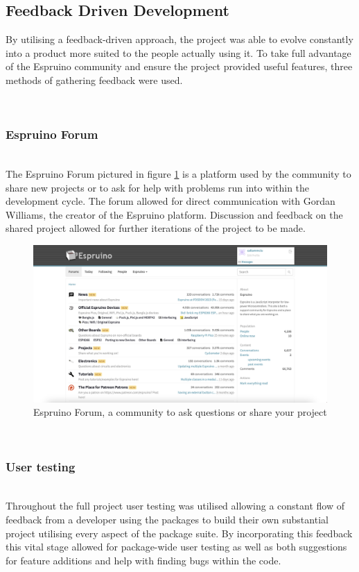 \documentclass{l4proj}
\begin{document}
\subsection{Feedback Driven Development}
By utilising a feedback-driven approach, the project was able to evolve constantly into a product more suited to the people actually using it. To take full advantage of the Espruino community and ensure the project provided useful features, three methods of gathering feedback were used.

\text \\

\subsubsection{Espruino Forum}\hfill\\
The Espruino Forum pictured in figure \ref{fig:espruino-forum} is a platform used by the community to share new projects or to ask for help with problems run into within the development cycle. The forum allowed for direct communication with Gordan Williams, the creator of the Espruino platform. Discussion and feedback on the shared project allowed for further iterations of the project to be made.

\begin{figure}[!ht]
    \centering
    \includegraphics[width=12cm]{dissertation/images/espruino-forum.png}
    \caption{Espruino Forum, a community to ask questions or share your project}
    \label{fig:espruino-forum}
\end{figure}

\text \\
\subsubsection{User testing}\hfill\\
Throughout the full project user testing was utilised allowing a constant flow of feedback from a developer using the packages to build their own substantial project utilising every aspect of the package suite. By incorporating this feedback this vital stage allowed for package-wide user testing as well as both suggestions for feature additions and help with finding bugs within the code.
\end{document}
